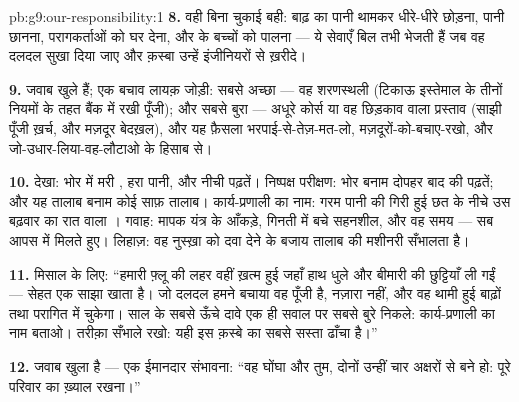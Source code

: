 \begin{solution}{pb:g9:our-responsibility:1}
\textbf{8.} वही बिना चुकाई बही: बाढ़ का पानी थामकर धीरे-धीरे छोड़ना, पानी
छानना, परागकर्ताओं को घर देना, और  के बच्चों को पालना --- ये सेवाएँ
बिल तभी भेजती हैं जब वह दलदल सुखा दिया जाए और क़स्बा उन्हें इंजीनियरों से
ख़रीदे।

\textbf{9.} जवाब खुले हैं; एक बचाव लायक़ जोड़ी: सबसे अच्छा --- वह
शरणस्थली (टिकाऊ इस्तेमाल के तीनों नियमों के तहत बैंक में रखी पूँजी); और
सबसे बुरा --- अधूरे कोर्स या वह छिड़काव वाला प्रस्ताव (साझी पूँजी ख़र्च,
और मज़दूर बेदख़ल), और यह फ़ैसला भरपाई-से-तेज़-मत-लो,
मज़दूरों-को-बचाए-रखो, और जो-उधार-लिया-वह-लौटाओ के हिसाब से।

\textbf{10.} देखा: भोर में मरी , हरा पानी, और नीची पढ़तें।
निष्पक्ष परीक्षण: भोर बनाम दोपहर बाद की पढ़तें; और यह तालाब बनाम कोई साफ़
तालाब। कार्य-प्रणाली का नाम: गरम पानी की गिरी हुई छत के नीचे उस बढ़वार का
रात वाला । गवाह: मापक यंत्र के आँकड़े, गिनती में बचे सहनशील, और वह
समय --- सब आपस में मिलते हुए। लिहाज़: वह नुस्ख़ा  को दवा देने के
बजाय तालाब की  मशीनरी सँभालता है।

\textbf{11.} मिसाल के लिए: ``हमारी फ़्लू की लहर वहीं ख़त्म हुई जहाँ हाथ
धुले और बीमारी की छुट्टियाँ ली गईं --- सेहत एक साझा खाता है। जो दलदल हमने
बचाया वह पूँजी है, नज़ारा नहीं, और वह थामी हुई बाढ़ों तथा परागित 
में चुकेगा। साल के सबसे ऊँचे दावे एक ही सवाल पर सबसे बुरे निकले:
कार्य-प्रणाली का नाम बताओ। तरीक़ा सँभाले रखो: यही इस क़स्बे का सबसे सस्ता
ढाँचा है।''

\textbf{12.} जवाब खुला है --- एक ईमानदार संभावना: ``वह घोंघा और तुम,
दोनों उन्हीं चार अक्षरों से बने हो: पूरे परिवार का ख़्याल रखना।''
\end{solution}
